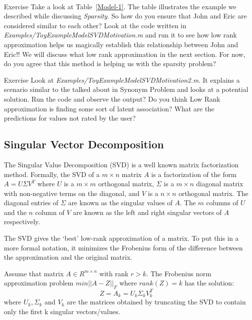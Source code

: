 \\
\begin{myremark}{Exercise }
Take a look at Table~\ref{Model-1}. The table illustrates the example we described while discussing \textit{Sparsity}. So how do you ensure that John and Eric are considered similar to each other? Look at the code written in \textit{Examples/ToyExampleModelSVDMotivation.m} and run it to see how low rank approximation helps us magically establish this relationship between John and Eric!! We will discuss what low rank approximation in the next section.  For now, do you agree that this method is helping us with the sparsity problem? 
\end{myremark}

\begin{myremark}{Exercise }
Look at \textit{Examples/ToyExampleModelSVDMotivation2.m}. It explains a scenario similar to the talked about in Synonym Problem and looks at a potential solution. Run the code and observe the output? Do you think Low Rank approximation is finding some sort of latent association? What are the predictions for values not rated by the user?
\end{myremark}
  \subsection{Singular Vector Decomposition}

The Singular Value Decomposition (SVD) is a well known matrix factorization method. Formally, the SVD of a $m \times n$ matrix $A$ is a factorization of the form $A = U \Sigma V^{T}$ where $U$ is a $m \times m$ orthogonal matrix, $\Sigma$ is a $m \times n$ diagonal matrix with non-negative terms on the diagonal, and $V$ is a $n \times n$ orthogonal matrix. The diagonal entries of $\Sigma$ are known as the singular values of $A$. The $m$ columns of $U$ and the $n$ column of $V$ are known as the left and right singular vectors of $A$ respectively. 

The SVD gives the `best' low-rank approximation of a matrix. To put this in a more formal notation, it minimizes the Frobenius form of the difference between the approximation and the original matrix.

Assume that matrix $A \in R^{m \times n}$ with rank $r > k$. The Frobenius norm approximation problem $min || A - Z ||_{F}$ where $rank(Z) = k$ has the solution:
\[Z = A_{k} = U_{k} \Sigma_{k} V_{k}^{T}\]
where $U_{k}, \Sigma_{k}$ and $V_{k}$ are the matrices obtained by truncating the SVD to contain only the first k singular vectors/values.

